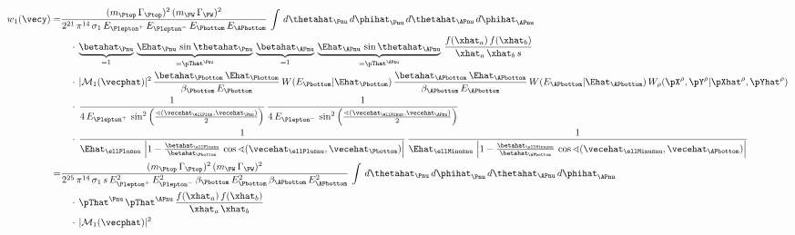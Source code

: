 \begin{linenowrapper}
\begin{align}
w_{1}(\vecy) 
 = & \frac{(m_{\Ptop} \, \Gamma_{\Ptop})^{2} \, (m_{\PW} \, \Gamma_{\PW})^{2}}{2^{21} \, \pi^{14} \, \sigma_{1} \, E_{\Plepton^{+}} \, E_{\Plepton^{-}} \, E_{\Pbottom} \, E_{\APbottom}} \, \int \,
d\thetahat_{\Pnu} \, d\phihat_{\Pnu} \, d\thetahat_{\APnu} \, d\phihat_{\APnu}  \nonumber \\
 & \quad \cdot \, \underbrace{\betahat_{\Pnu}}_{= 1} \, \underbrace{\Ehat_{\Pnu} \, \sin\thetahat_{\Pnu}}_{= \pThat^{\Pnu}} \, 
  \underbrace{\betahat_{\APnu}}_{= 1} \, \underbrace{\Ehat_{\APnu} \, \sin\thetahat_{\APnu}}_{= \pThat^{\APnu}} \, 
\frac{f(\xhat_{a}) \, f(\xhat_{b})}{\xhat_{a} \, \xhat_{b} \, s} \nonumber \\
 & \quad \cdot \, \vert \mathcal{M}_{1}(\vecphat) \vert^{2} \, 
\frac{\betahat_{\Pbottom} \, \Ehat_{\Pbottom}}{\beta_{\Pbottom} \, E_{\Pbottom}} \, W(E_{\Pbottom}|\Ehat_{\Pbottom}) \, 
\frac{\betahat_{\APbottom} \, \Ehat_{\APbottom}}{\beta_{\APbottom} \, E_{\APbottom}} \, W(E_{\APbottom}|\Ehat_{\APbottom}) \,
W_{\rho}( \pX^{\rho},\pY^{\rho} | \pXhat^{\rho},\pYhat^{\rho} ) \nonumber \\
 & \quad \cdot \, \frac{1}{4 \, E_{\Plepton^{+}} \, \sin^{2}\left(\frac{\sphericalangle(\vecehat_{\ellPlus},\vecehat_{\Pnu})}{2}\right)} \, 
\frac{1}{4 \, E_{\Plepton^{-}} \, \sin^{2}\left(\frac{\sphericalangle(\vecehat_{\ellMinus},\vecehat_{\APnu})}{2}\right)} \nonumber \\
 & \quad \cdot \, \frac{1}{\Ehat_{\ellPlusnu} \, \left\lvert 1 - \frac{\betahat_{\ellPlusnu}}{\betahat_{\Pbottom}} \, \cos\sphericalangle(\vecehat_{\ellPlusnu},\vecehat_{\Pbottom}) \right\rvert} \,
\frac{1}{\Ehat_{\ellMinusnu} \, \left\lvert 1 - \frac{\betahat_{\ellMinusnu}}{\betahat_{\APbottom}} \, \cos\sphericalangle(\vecehat_{\ellMinusnu},\vecehat_{\APbottom}) \right\rvert} \nonumber \\
 = & \frac{(m_{\Ptop} \, \Gamma_{\Ptop})^{2} \, (m_{\PW} \, \Gamma_{\PW})^{2}}{2^{25} \, \pi^{14} \, \sigma_{1} \, s \, 
  E_{\Plepton^{+}}^{2} \, E_{\Plepton^{-}}^{2} \, \beta_{\Pbottom} \, E_{\Pbottom}^{2} \, \beta_{\APbottom} \, E_{\APbottom}^{2}} \, \int \,
d\thetahat_{\Pnu} \, d\phihat_{\Pnu} \, d\thetahat_{\APnu} \, d\phihat_{\APnu}  \nonumber \\
 & \quad \cdot \, \pThat^{\Pnu} \, \pThat^{\APnu} \,
\frac{f(\xhat_{a}) \, f(\xhat_{b})}{\xhat_{a} \, \xhat_{b}} \nonumber \\
 & \quad \cdot \, \vert \mathcal{M}_{1}(\vecphat) \vert^{2} \, 

\end{align}
\end{linenowrapper}
